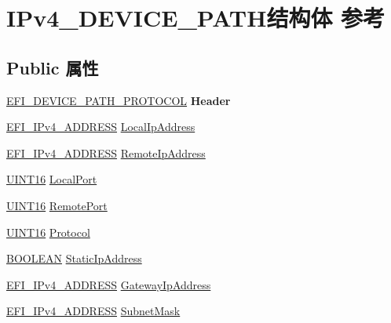 \hypertarget{struct_i_pv4___d_e_v_i_c_e___p_a_t_h}{}\section{I\+Pv4\+\_\+\+D\+E\+V\+I\+C\+E\+\_\+\+P\+A\+T\+H结构体 参考}
\label{struct_i_pv4___d_e_v_i_c_e___p_a_t_h}
\subsection*{Public 属性}
\begin{DoxyCompactItemize}
\item 
\mbox{\label{struct_i_pv4___d_e_v_i_c_e___p_a_t_h_a57345aeb6c28dfaf8dac67dec2f7c50a}} 
\hyperlink{struct_e_f_i___d_e_v_i_c_e___p_a_t_h___p_r_o_t_o_c_o_l}{E\+F\+I\+\_\+\+D\+E\+V\+I\+C\+E\+\_\+\+P\+A\+T\+H\+\_\+\+P\+R\+O\+T\+O\+C\+OL} {\bfseries Header}
\item 
\hyperlink{struct_e_f_i___i_pv4___a_d_d_r_e_s_s}{E\+F\+I\+\_\+\+I\+Pv4\+\_\+\+A\+D\+D\+R\+E\+SS} \hyperlink{struct_i_pv4___d_e_v_i_c_e___p_a_t_h_aa2923ab29aac16a79bd20cecfc67fc9b}{Local\+Ip\+Address}
\item 
\hyperlink{struct_e_f_i___i_pv4___a_d_d_r_e_s_s}{E\+F\+I\+\_\+\+I\+Pv4\+\_\+\+A\+D\+D\+R\+E\+SS} \hyperlink{struct_i_pv4___d_e_v_i_c_e___p_a_t_h_af8b4f54546bd1066f0f324a638a785b7}{Remote\+Ip\+Address}
\item 
\hyperlink{_processor_bind_8h_a09f1a1fb2293e33483cc8d44aefb1eb1}{U\+I\+N\+T16} \hyperlink{struct_i_pv4___d_e_v_i_c_e___p_a_t_h_a3763910c98a6f66011c4a4345fffdefb}{Local\+Port}
\item 
\hyperlink{_processor_bind_8h_a09f1a1fb2293e33483cc8d44aefb1eb1}{U\+I\+N\+T16} \hyperlink{struct_i_pv4___d_e_v_i_c_e___p_a_t_h_aa47f2db9394884c5cea7a10aa23395d4}{Remote\+Port}
\item 
\hyperlink{_processor_bind_8h_a09f1a1fb2293e33483cc8d44aefb1eb1}{U\+I\+N\+T16} \hyperlink{struct_i_pv4___d_e_v_i_c_e___p_a_t_h_a0a0c4116b3d415288692941d33d79e9d}{Protocol}
\item 
\hyperlink{_processor_bind_8h_a112e3146cb38b6ee95e64d85842e380a}{B\+O\+O\+L\+E\+AN} \hyperlink{struct_i_pv4___d_e_v_i_c_e___p_a_t_h_a8948f5aa5deccf2315d71cd0b4d85e9d}{Static\+Ip\+Address}
\item 
\hyperlink{struct_e_f_i___i_pv4___a_d_d_r_e_s_s}{E\+F\+I\+\_\+\+I\+Pv4\+\_\+\+A\+D\+D\+R\+E\+SS} \hyperlink{struct_i_pv4___d_e_v_i_c_e___p_a_t_h_a4ff5e5cfc339b5ea9b6b53e257fe593a}{Gateway\+Ip\+Address}
\item 
\hyperlink{struct_e_f_i___i_pv4___a_d_d_r_e_s_s}{E\+F\+I\+\_\+\+I\+Pv4\+\_\+\+A\+D\+D\+R\+E\+SS} \hyperlink{struct_i_pv4___d_e_v_i_c_e___p_a_t_h_a71cc05843ec9031962b802ef65534d7d}{Subnet\+Mask}
\end{DoxyCompactItemize}


